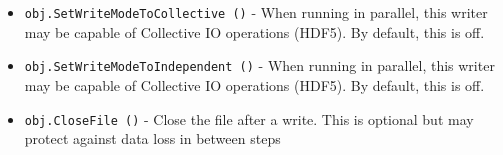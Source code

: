 \begin{itemize}
\item  \verb|obj.SetWriteModeToCollective ()| -  When running in parallel, this writer may be capable of 
 Collective IO operations (HDF5). By default, this is off.

\item  \verb|obj.SetWriteModeToIndependent ()| -  When running in parallel, this writer may be capable of 
 Collective IO operations (HDF5). By default, this is off.

\item  \verb|obj.CloseFile ()| -  Close the file after a write. This is optional but
 may protect against data loss in between steps

\end{itemize}
